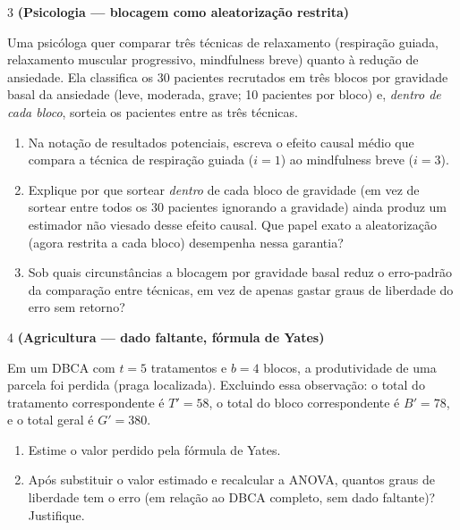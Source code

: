 \documentclass[11pt]{article}
\begin{document}
\begin{questao}{3} \textbf{(Psicologia --- blocagem como aleatorização restrita)}

Uma psicóloga quer comparar três técnicas de relaxamento (respiração guiada, relaxamento
muscular progressivo, mindfulness breve) quanto à redução de ansiedade. Ela classifica os 30
pacientes recrutados em três blocos por gravidade basal da ansiedade (leve, moderada, grave; 10
pacientes por bloco) e, \emph{dentro de cada bloco}, sorteia os pacientes entre as três técnicas.

\begin{enumerate}[label=(\alph*)]
  \item Na notação de resultados potenciais, escreva o efeito causal médio que compara a técnica
    de respiração guiada ($i=1$) ao mindfulness breve ($i=3$).
  \item Explique por que sortear \emph{dentro} de cada bloco de gravidade (em vez de sortear entre
    todos os 30 pacientes ignorando a gravidade) ainda produz um estimador não viesado desse
    efeito causal. Que papel exato a aleatorização (agora restrita a cada bloco) desempenha nessa
    garantia?
  \item Sob quais circunstâncias a blocagem por gravidade basal reduz o erro-padrão da comparação
    entre técnicas, em vez de apenas gastar graus de liberdade do erro sem retorno?
\end{enumerate}
\end{questao}

\begin{questao}{4} \textbf{(Agricultura --- dado faltante, fórmula de Yates)}

Em um DBCA com $t=5$ tratamentos e $b=4$ blocos, a produtividade de uma parcela foi perdida
(praga localizada). Excluindo essa observação: o total do tratamento correspondente é
$T'=58$, o total do bloco correspondente é $B'=78$, e o total geral é $G'=380$.

\begin{enumerate}[label=(\alph*)]
  \item Estime o valor perdido pela fórmula de Yates.
  \item Após substituir o valor estimado e recalcular a ANOVA, quantos graus de liberdade tem o
    erro (em relação ao DBCA completo, sem dado faltante)? Justifique.
\end{enumerate}
\end{questao}
\end{document}
